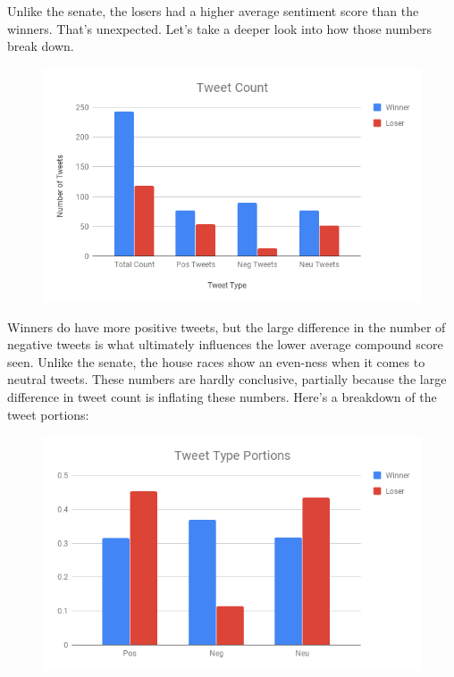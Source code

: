 \documentclass[11pt, twoside, reqno]{article}
\begin{document}
Unlike the senate, the losers had a higher average sentiment score than the winners. That's unexpected. Let's take a deeper look into how those numbers break down. 

\begin{figure}[H]
\centering
	\includegraphics[scale=0.5]{house_tweet_type}
\end{figure}

Winners do have more positive tweets, but the large difference in the number of negative tweets is what ultimately influences the lower average compound score seen. Unlike the senate, the house races show an even-ness when it comes to neutral tweets. These numbers are hardly conclusive, partially because the large difference in tweet count is inflating these numbers. Here's a breakdown of the tweet portions:

\begin{figure}[H]
\centering
	\includegraphics[scale=0.5]{house_tweet_breakdown}
\end{figure}
\end{document}
